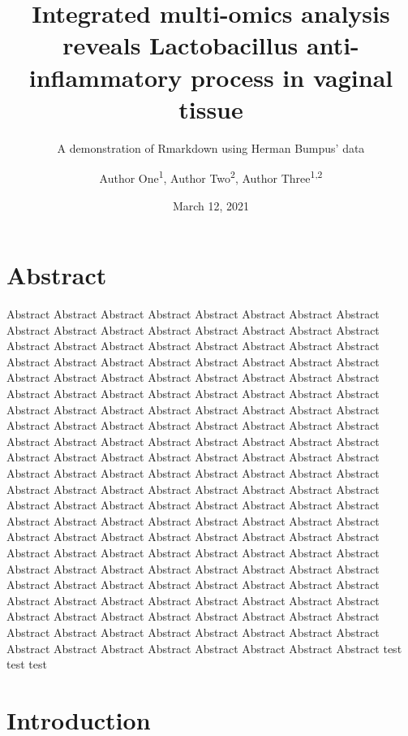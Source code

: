 \documentclass[
]{article}
\title{Integrated multi-omics analysis reveals Lactobacillus anti-inflammatory process in vaginal tissue}
\subtitle{A demonstration of Rmarkdown using Herman Bumpus' data}
\author{Author One\textsuperscript{1},
Author Two\textsuperscript{2},
Author Three\textsuperscript{1,2}}
\date{March 12, 2021}
\begin{document}
\maketitle


\hypertarget{abstract}{%
\section{Abstract}\label{abstract}}

Abstract Abstract Abstract Abstract Abstract Abstract Abstract Abstract Abstract Abstract Abstract Abstract Abstract Abstract Abstract Abstract Abstract Abstract Abstract Abstract Abstract Abstract Abstract Abstract Abstract Abstract Abstract Abstract Abstract Abstract Abstract Abstract Abstract Abstract Abstract Abstract Abstract Abstract Abstract Abstract Abstract Abstract Abstract Abstract Abstract Abstract Abstract Abstract Abstract Abstract Abstract Abstract Abstract Abstract Abstract Abstract Abstract Abstract Abstract Abstract Abstract Abstract Abstract Abstract Abstract Abstract Abstract Abstract Abstract Abstract Abstract Abstract Abstract Abstract Abstract Abstract Abstract Abstract Abstract Abstract Abstract Abstract Abstract Abstract Abstract Abstract Abstract Abstract Abstract Abstract Abstract Abstract Abstract Abstract Abstract Abstract Abstract Abstract Abstract Abstract Abstract Abstract Abstract Abstract Abstract Abstract Abstract Abstract Abstract Abstract Abstract Abstract Abstract Abstract Abstract Abstract Abstract Abstract Abstract Abstract Abstract Abstract Abstract Abstract Abstract Abstract Abstract Abstract Abstract Abstract Abstract Abstract Abstract Abstract Abstract Abstract Abstract Abstract Abstract Abstract Abstract Abstract Abstract Abstract Abstract Abstract Abstract Abstract Abstract Abstract Abstract Abstract Abstract Abstract Abstract Abstract Abstract Abstract Abstract Abstract Abstract Abstract Abstract Abstract Abstract Abstract Abstract Abstract Abstract Abstract Abstract Abstract Abstract Abstract Abstract Abstract
test test test

\clearpage

\hypertarget{introduction}{%
\section{Introduction}\label{introduction}}
\end{document}
